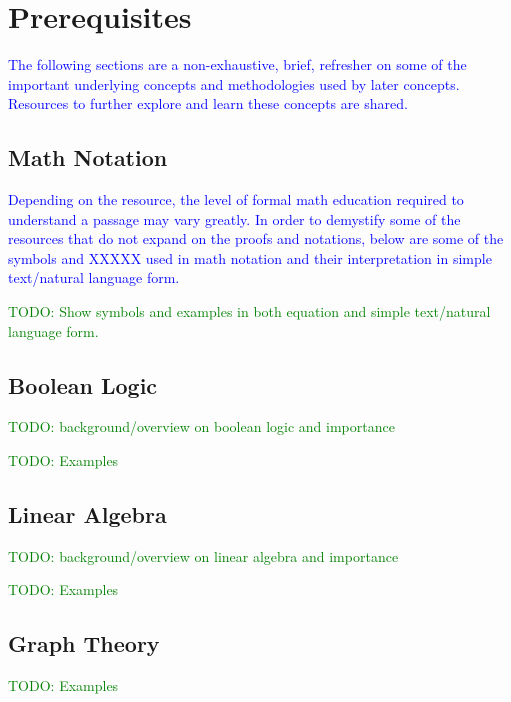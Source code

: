 \chapter{Prerequisites}

\textcolor{blue}{The following sections are a non-exhaustive, brief, refresher on some of the important underlying concepts and methodologies used by later concepts. Resources to further explore and learn these concepts are shared.}


\section{Math Notation}

\textcolor{blue}{Depending on the resource, the level of formal math education required to understand a passage may vary greatly. In order to demystify some of the resources that do not expand on the proofs and notations, below are some of the symbols and XXXXX used in math notation and their interpretation in simple text/natural language form.}

\textcolor{green}{TODO: Show symbols and examples in both equation and simple text/natural language form.}


\section{Boolean Logic}

\textcolor{green}{TODO: background/overview on boolean logic and importance}

\textcolor{green}{TODO: Examples}


\section{Linear Algebra}

\textcolor{green}{TODO: background/overview on linear algebra and importance}

\textcolor{green}{TODO: Examples}


\section{Graph Theory}

\textcolor{green}{TODO: Examples}